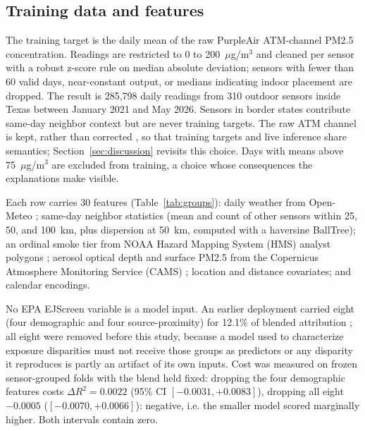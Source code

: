 \documentclass[conference]{IEEEtran}
\newcommand{\ugm}{$\mu$g/m$^3$}
\begin{document}
\subsection{Training data and features}
The training target is the daily mean of the raw PurpleAir ATM-channel
PM2.5 concentration. Readings are restricted to 0 to 200~\ugm{} and
cleaned per sensor with a robust z-score rule on median absolute
deviation; sensors with fewer than 60 valid days, near-constant output, or
medians indicating indoor placement are dropped. The result is 285,798 daily
readings from 310 outdoor sensors inside Texas between January 2021 and May
2026. Sensors in border states contribute same-day neighbor context but are
never training targets. The raw ATM channel is kept, rather than corrected
\cite{barkjohn2021}, so that training targets and live inference share
semantics; Section~\ref{sec:discussion} revisits this choice. Days with
means above 75~\ugm{} are excluded
from training, a choice whose consequences the explanations make visible.

Each row carries 30 features (Table~\ref{tab:groups}): daily weather from
Open-Meteo \cite{zippenfenig}; same-day neighbor statistics (mean and
count of other sensors within 25, 50, and 100~km, plus dispersion at
50~km, computed with a haversine BallTree); an ordinal smoke tier from
NOAA Hazard Mapping System (HMS) analyst polygons \cite{brey2018}; aerosol optical depth and surface PM2.5
from the Copernicus Atmosphere Monitoring Service (CAMS) \cite{peuch2022};
location and distance covariates; and calendar encodings.

No EPA EJScreen variable is a model input. An earlier deployment carried
eight (four demographic and four source-proximity) for 12.1\% of
blended attribution \cite{ejscreen}; all eight were removed before this study,
because a model used to characterize exposure disparities must not receive
those groups as predictors or any disparity it reproduces is partly an
artifact of its own inputs. Cost was measured on frozen sensor-grouped folds
with the blend held fixed: dropping the four demographic features costs
$\Delta R^2 = 0.0022$ (95\% CI $[-0.0031,+0.0083]$), dropping all eight
$-0.0005$ ($[-0.0070,+0.0066]$): negative, i.e. the smaller model scored
marginally higher. Both intervals contain zero.
\end{document}

